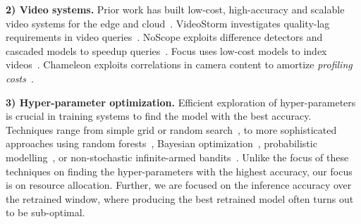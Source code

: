 \noindent\textbf{2) Video  systems.} Prior work has built low-cost, high-accuracy and scalable video  systems for the edge and cloud~\cite{videostorm,chameleon,noscope}. VideoStorm investigates quality-lag requirements in video queries~\cite{videostorm}. NoScope exploits difference detectors and cascaded models to speedup queries~\cite{noscope}. Focus uses low-cost models to index videos~\cite{DBLP:conf/osdi/HsiehABVBPGM18}. Chameleon exploits correlations in camera content to amortize {\em profiling costs}~\cite{chameleon}. 


\noindent\textbf{3) Hyper-parameter optimization.} %
Efficient exploration of hyper-parameters is crucial in training systems to find the model with the best accuracy. Techniques range from simple grid or random search~\cite{DBLP:journals/jmlr/BergstraB12}, to more sophisticated approaches using random forests~\cite{DBLP:conf/lion/HutterHL11}, Bayesian optimization~\cite{DBLP:conf/nips/SnoekLA12, Swersky_scalablebayesian}, probabilistic modelling~\cite{DBLP:conf/middleware/RasleyH0RF17}, or non-stochastic infinite-armed bandits~\cite{DBLP:journals/jmlr/LiJDRT17}. Unlike the focus of these techniques on finding the hyper-parameters with the highest accuracy, our focus is on resource allocation. Further, we are focused on the inference accuracy over the retrained window, where producing the best retrained model often turns out to be sub-optimal.%

